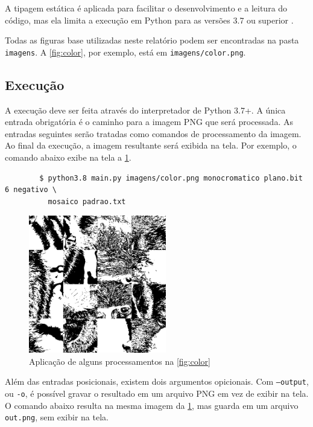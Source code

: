 \documentclass[assignment = 0]{homework}
\begin{document}
    A tipagem estática é aplicada para facilitar o desenvolvimento e a leitura do código, mas ela limita a execução em Python para as versões 3.7 ou superior \autocite{ref:pep563}.

    Todas as figuras base utilizadas neste relatório podem ser encontradas na pasta \texttt{imagens}. A \cref{fig:color}, por exemplo, está em \texttt{imagens/color.png}.

    \subsection{Execução}

    A execução deve ser feita através do interpretador de Python 3.7+. A única entrada obrigatória é o caminho para a imagem PNG que será processada. As entradas seguintes serão tratadas como comandos de processamento da imagem. Ao final da execução, a imagem resultante será exibida na tela. Por exemplo, o comando abaixo exibe na tela a \cref{fig:execucao}.

    \begin{verbatim}
        $ python3.8 main.py imagens/color.png monocromatico plano.bit 6 negativo \
          mosaico padrao.txt
    \end{verbatim}

    \begin{figure}[H]
        \centering
        \includegraphics[width=6cm]{resultados/execucao.png}

        \caption{Aplicação de alguns processamentos na \cref{fig:color}}
        \label{fig:execucao}
    \end{figure}

    Além das entradas posicionais, existem dois argumentos opicionais. Com \texttt{--output}, ou \texttt{-o}, é possível gravar o resultado em um arquivo PNG em vez de exibir na tela. O comando abaixo resulta na mesma imagem da \cref{fig:execucao}, mas guarda em um arquivo \texttt{out.png}, sem exibir na tela.
\end{document}
